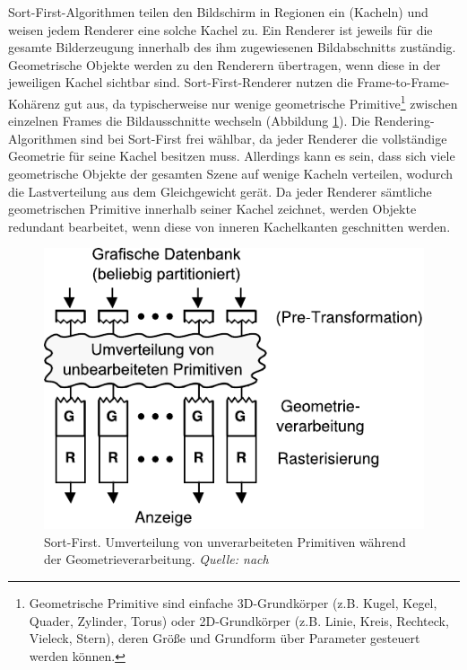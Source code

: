 Sort-First-Algorithmen teilen den Bildschirm in Regionen ein (Kacheln) und weisen jedem Renderer eine solche Kachel zu. Ein Renderer ist jeweils für die gesamte Bilderzeugung innerhalb des ihm zugewiesenen Bildabschnitts zuständig. Geometrische Objekte werden zu den Renderern übertragen, wenn diese in der jeweiligen Kachel sichtbar sind. Sort-First-Renderer nutzen die Frame-to-Frame-Kohärenz gut aus, da typischerweise nur wenige geometrische Primitive\footnote{Geometrische Primitive sind einfache 3D-Grundkörper (z.B. Kugel, Kegel, Quader, Zylinder, Torus) oder 2D-Grundkörper (z.B. Linie, Kreis, Rechteck, Vieleck, Stern), deren Größe und Grundform über Parameter gesteuert werden können.} zwischen einzelnen Frames die Bildausschnitte wechseln (Abbildung \ref{fig:relwork:sortfirst}). Die Rendering-Algorithmen sind bei Sort-First frei wählbar, da jeder Renderer die vollständige Geometrie für seine Kachel besitzen muss. Allerdings kann es sein, dass sich viele geometrische Objekte der gesamten Szene auf wenige Kacheln verteilen, wodurch die Lastverteilung aus dem Gleichgewicht gerät. Da jeder Renderer sämtliche geometrischen Primitive innerhalb seiner Kachel zeichnet, werden Objekte redundant bearbeitet, wenn diese von inneren Kachelkanten geschnitten werden.
\begin{figure}
 \centering
  \includegraphics[scale=0.8]{images/sort-first.pdf}
  \caption{Sort-First. Umverteilung von unverarbeiteten Primitiven während der Geometrieverarbeitung. \textit{Quelle: nach}}
 \label{fig:relwork:sortfirst}
\end{figure}

